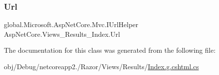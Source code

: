 \subsubsection{\texorpdfstring{Url}{Url}}
{\footnotesize\ttfamily global.\+Microsoft.\+Asp\+Net\+Core.\+Mvc.\+I\+Url\+Helper Asp\+Net\+Core.\+Views\+\_\+\+Results\+\_\+\+Index.\+Url\hspace{0.3cm}{\ttfamily [get]}}



The documentation for this class was generated from the following file\+:\begin{DoxyCompactItemize}
\item 
obj/\+Debug/netcoreapp2./\+Razor/\+Views/\+Results/\mbox{\hyperlink{_results_2_index_8g_8cshtml_8cs}{Index.\+g.\+cshtml.\+cs}}\end{DoxyCompactItemize}
